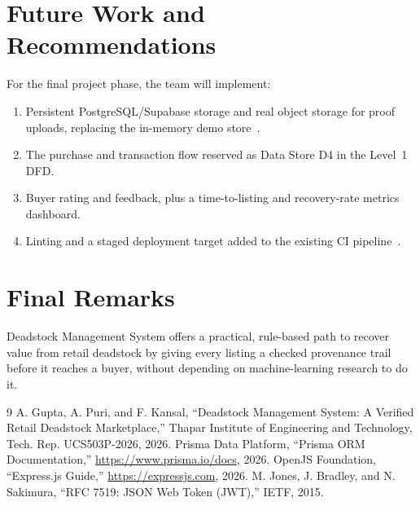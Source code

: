 \documentclass[11pt,a4paper]{report}
\begin{document}
\section{Future Work and Recommendations}
For the final project phase, the team will implement:
\begin{enumerate}[leftmargin=0.8cm]
    \item Persistent PostgreSQL/Supabase storage and real object storage for proof uploads, replacing the in-memory demo store~\cite{prisma}.
    \item The purchase and transaction flow reserved as Data Store D4 in the Level~1 DFD.
    \item Buyer rating and feedback, plus a time-to-listing and recovery-rate metrics dashboard.
    \item Linting and a staged deployment target added to the existing CI pipeline~\cite{express}.
\end{enumerate}

\section{Final Remarks}
Deadstock Management System offers a practical, rule-based path to recover
value from retail deadstock by giving every listing a checked provenance
trail before it reaches a buyer, without depending on machine-learning
research to do it.

\begin{thebibliography}{9}
 A. Gupta, A. Puri, and F. Kansal, ``Deadstock Management System: A Verified Retail Deadstock Marketplace,'' Thapar Institute of Engineering and Technology, Tech. Rep. UCS503P-2026, 2026.
 Prisma Data Platform, ``Prisma ORM Documentation,'' \url{https://www.prisma.io/docs}, 2026.
 OpenJS Foundation, ``Express.js Guide,'' \url{https://expressjs.com}, 2026.
 M. Jones, J. Bradley, and N. Sakimura, ``RFC 7519: JSON Web Token (JWT),'' IETF, 2015.
\end{thebibliography}
\end{document}
